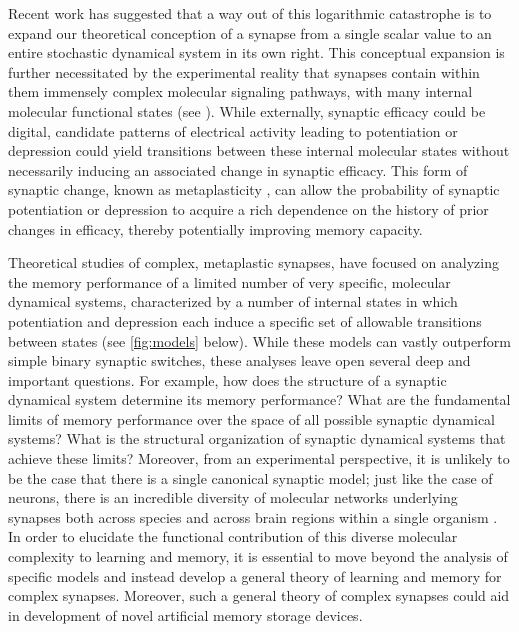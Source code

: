 \documentclass{article} %
\begin{document}
Recent work \cite{Fusi2005cascade,Fusi2007multistate,Leibold2008serial} has suggested that a way out of this logarithmic catastrophe is to expand our theoretical conception of a synapse from a single scalar value to an entire stochastic dynamical system in its own right.
This conceptual expansion is further necessitated by the experimental reality that synapses contain within them immensely complex molecular signaling pathways, with many internal molecular functional states (\eg see \cite{Bliss1993LTP,Bredt2003AMPA,Coba2009phosphorylation}).
While externally, synaptic efficacy could be digital, candidate patterns of electrical activity leading to potentiation or depression could yield transitions between these internal molecular states without necessarily inducing an associated change in synaptic efficacy.
This form of synaptic change, known as metaplasticity \cite{Abraham1996metaplasticity,Montgomery2002765}, can allow the probability of synaptic potentiation or depression to acquire a rich dependence on the history of prior changes in efficacy, thereby potentially improving memory capacity.

Theoretical studies of complex, metaplastic synapses, have focused on analyzing the memory performance of a limited number of very specific, molecular dynamical systems, characterized by a number of internal states in which potentiation and depression each induce a specific set of allowable transitions between states (\eg see \autoref{fig:models} below).
While these models can vastly outperform simple binary synaptic switches, these analyses leave open several deep and important questions.
For example, how does the structure of a synaptic dynamical system determine its memory performance?  What are the fundamental limits of memory performance over the space of all possible synaptic dynamical systems?
What is the structural organization of synaptic dynamical systems that achieve these limits?
Moreover, from an experimental perspective, it is unlikely to be the case that there is a single canonical synaptic model;  just like the case of neurons, there is an incredible diversity of molecular networks underlying synapses both across species and across brain regions within a single organism \cite{Emes2012synapserev}.
In order to elucidate the functional contribution of this diverse molecular complexity to learning and memory, it is essential to move beyond the analysis of specific models and instead develop a general theory of learning and memory for complex synapses.
Moreover, such a general theory of complex synapses could aid in development of novel artificial memory storage devices.  %
\end{document}
